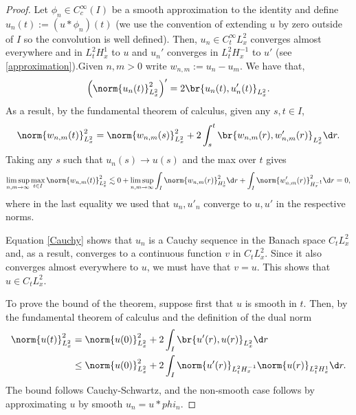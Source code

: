 \documentclass[
    a4paper,
    DIV=14,
    abstract=true,
    numbers=noenddot
]{scrartcl}
\begin{document}
\begin{proof}
 Let $\phi_n \in C_c^ \infty(I) $ be a smooth approximation to the identity and define $u_n(t):=(u* \phi_n)(t)$ (we use the convention of extending $u$ by zero outside of $I$ so the convolution is well defined). Then, $u_n \in C^\infty_t L_x^2$ converges almost everywhere and in $L_t^2 H_x^1$ to $u$ and $u_n '$ converges in $L_t^2 H_x^{-1}$ to $u'$ (see \eqref{approximation}).Given $n , m >0$ write $w_{n,m}:= u_n - u_m$. We have that,
  \begin{align*}
    \left(\norm{u_n(t)}^2_{L_x^2}\right)' = 2\br{u_n(t),u_n'(t)}_{L^2_x}.
  \end{align*}
 As a result, by the fundamental theorem of calculus, given any $s,t \in I$,
  \begin{align*}
    \norm{w_{n,m}(t)}_{L^2_x}^2 = \norm{w_{n,m}(s)}_{L^2_x}^2 +2\int_{s}^t \br{w_{n,m}(r),w_{n,m}'(r)}_{L^2_x} \d r.
  \end{align*}
 Taking any $s$ such that $u_n(s) \to u(s)$ and the max over $t$ gives
  \begin{align}\label{Cauchy}
    \limsup_{n , m \to \infty} \max_{t \in I}\norm{w_{n,m}(t) }_{L^2_x}^2 \lesssim 0 + \limsup_{n , m \to \infty}\int_{I} \norm{w_{n,m}(r) }_{H^1_x}^2 \d r + \int_{I} \norm{w'_{n,m}(r)}_{H^{-1}_x}^2 \d r=0,
  \end{align}
 where in the last equality we used that $u_n ,u'_n $ converge to $u,u'$ in the respective norms.

 Equation \eqref{Cauchy} shows that $u_n $ is a Cauchy sequence in the Banach space $C_t L_x^2$ and, as a result, converges to a continuous function $v$ in $C_t L_x^2$. Since it also converges almost everywhere to $u$, we must have that $v=u$. This shows that $u \in C_t L_x^2$.


 To prove the bound of the theorem, suppose first that $u$ is smooth in $t$. Then, by the fundamental theorem of calculus and the definition of the dual norm
  \begin{align*}
    \norm{u(t)}_{L_x^2}^2 & = \norm{u(0)}_{L_x^2}^2 + 2\int_I \br{u'(r),u(r)}_{L_x^2} \d r \\&\leq \norm{u(0)}_{L_x^2}^2 + 2 \int_I \norm{u'(r)}_{L^2_tH_x^{-1}}\norm{u(r)}_{L^2_tH_x^1} \d r.
  \end{align*}
 The bound follows Cauchy-Schwartz, and the non-smooth case follows by approximating $u$ by smooth $u_n = u*phi_n$. 
\end{proof}
\end{document}
